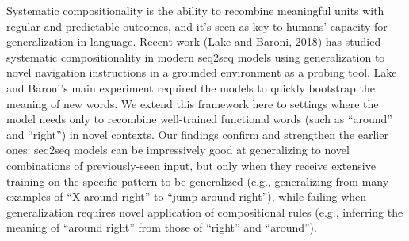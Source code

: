 Systematic compositionality is the ability to recombine meaningful units with regular and predictable outcomes, and it's seen as key to humans' capacity for generalization in language. Recent work (Lake and Baroni, 2018) has studied systematic compositionality in modern seq2seq models using generalization to novel navigation instructions in a grounded environment as a probing tool. Lake and Baroni's main experiment required the models to quickly bootstrap the meaning of new words. We extend this framework here to settings where the model needs only to recombine well-trained functional words (such as ``around'' and ``right'') in novel contexts. Our findings confirm and strengthen the earlier ones: seq2seq models can be impressively good at generalizing to novel combinations of previously-seen input, but only when they receive extensive training on the specific pattern to be generalized (e.g., generalizing from many examples of ``X around right'' to ``jump around right''), while failing when generalization requires novel application of compositional rules (e.g., inferring the meaning of ``around right'' from those of ``right'' and ``around'').
